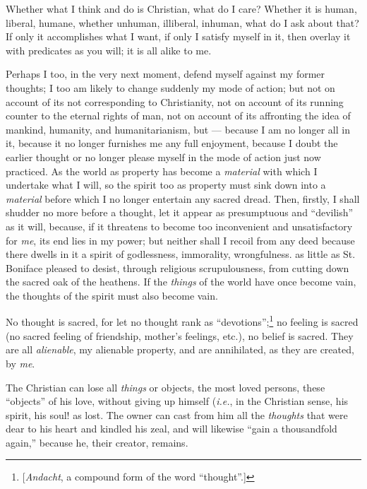 \myhrule


Whether what I think and do is Christian, what do I care? Whether it is human, 
liberal, humane, whether unhuman, illiberal, inhuman, what do I ask about 
that? If only it accomplishes what I want, if only I satisfy myself in it, 
then overlay it with predicates as you will; it is all alike to me.

Perhaps I too, in the very next moment, defend myself against my former 
thoughts; I too am likely to change suddenly my mode of action; but not on 
account of its not corresponding to Christianity, not on account of its 
running counter to the eternal rights of man, not on account of its affronting 
the idea of mankind, humanity, and humanitarianism, but --- because I am no 
longer all in it, because it no longer furnishes me any full enjoyment, 
because I doubt the earlier thought or no longer please myself in the mode of 
action just now practiced. As the world as property has become a 
\textit{material} with which I undertake what I will, so the spirit too as 
property must sink down into a \textit{material} before which I no longer 
entertain any sacred dread. Then, firstly, I shall shudder no more before a 
thought, let it appear as presumptuous and ``devilish'' as it will, because, 
if it threatens to become too inconvenient and unsatisfactory for \textit{me}, 
its end lies in my power; but neither shall I recoil from any deed because 
there dwells in it a spirit of godlessness, immorality, wrongfulness. as 
little as St. Boniface pleased to desist, through religious scrupulousness, 
from cutting down the sacred oak of the heathens. If the \textit{things} of 
the world have once become vain, the thoughts of the spirit must also become 
vain.

No thought is sacred, for let no thought rank as 
``devotions'';\footnote{[\textit{Andacht}, a compound form of the word 
``thought''.]} no feeling is sacred (no sacred feeling of friendship, 
mother's feelings, etc.), no belief is sacred. They are all 
\textit{alienable}, my alienable property, and are annihilated, as they are 
created, by \textit{me}.

The Christian can lose all \textit{things} or objects, the most loved persons, 
these ``objects'' of his love, without giving up himself (\textit{i.e.}, in 
the Christian sense, his spirit, his soul! as lost. The owner can cast from 
him all the \textit{thoughts} that were dear to his heart and kindled his 
zeal, and will likewise ``gain a thousandfold again,'' because he, their 
creator, remains.

